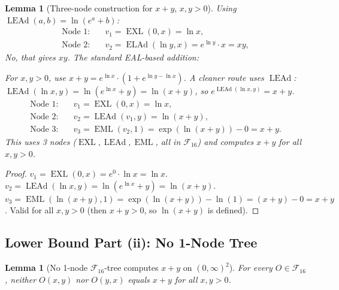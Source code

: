 \documentclass[12pt,a4paper]{article}
\newtheorem{lemma}[theorem]{Lemma}
\theoremstyle{definition}
\newcommand{\EML}{\operatorname{EML}}
\newcommand{\EXL}{\operatorname{EXL}}
\newcommand{\ELAd}{\operatorname{ELAd}}
\newcommand{\LEAd}{\operatorname{LEAd}}
\newcommand{\F}{\mathcal{F}_{16}}
\begin{document}
\begin{lemma}[Three-node construction for $x+y$, $x,y>0$]\label{lem:add-upper}
Using $\LEAd(a,b)=\ln(e^a+b)$:
\begin{align}
  \text{Node 1:}\quad & v_1 = \EXL(0, x) = \ln x, \label{eq:add-n1}\\
  \text{Node 2:}\quad & v_2 = \ELAd(\ln y, x) = e^{\ln y}\cdot x = xy, \label{eq:add-n2}
\end{align}
No, that gives $xy$.  The standard EAL-based addition:

For $x,y>0$, use $x+y = e^{\ln x}\!\cdot\!(1 + e^{\ln y - \ln x})$.  A cleaner
route uses $\LEAd$:
$\LEAd(\ln x, y) = \ln(e^{\ln x} + y) = \ln(x + y)$, so
$e^{\LEAd(\ln x, y)} = x+y$.
\begin{align}
  \text{Node 1:}\quad & v_1 = \EXL(0, x) = \ln x, \label{eq:add-n1b}\\
  \text{Node 2:}\quad & v_2 = \LEAd(v_1, y) = \ln(x + y), \label{eq:add-n2b}\\
  \text{Node 3:}\quad & v_3 = \EML(v_2, 1) = \exp(\ln(x+y)) - 0 = x+y. \label{eq:add-n3b}
\end{align}
This uses 3 nodes ($\EXL, \LEAd, \EML$, all in $\F$) and computes $x+y$ for all $x,y>0$.
\end{lemma}

\begin{proof}
$v_1 = \EXL(0,x) = e^0\cdot\ln x = \ln x$.
$v_2 = \LEAd(\ln x, y) = \ln(e^{\ln x} + y) = \ln(x+y)$.
$v_3 = \EML(\ln(x+y), 1) = \exp(\ln(x+y)) - \ln(1) = (x+y) - 0 = x+y$.
Valid for all $x,y>0$ (then $x+y>0$, so $\ln(x+y)$ is defined).
\end{proof}

\subsection{Lower Bound Part (ii): No 1-Node Tree}

\begin{lemma}[No 1-node $\F$-tree computes $x+y$ on $(0,\infty)^2$]
\label{lem:add-1node}
For every $O\in\F$, neither $O(x,y)$ nor $O(y,x)$ equals $x+y$
for all $x,y>0$.
\end{lemma}
\end{document}
